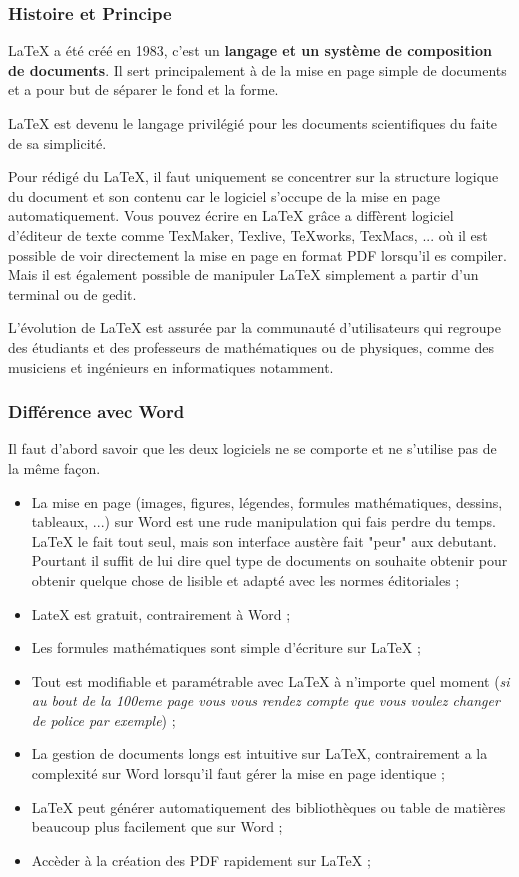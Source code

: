 \subsubsection{Histoire et Principe}

LaTeX a été créé en 1983, c'est un \textbf{langage et un système de composition de documents}.
Il sert principalement à de la mise en page simple de documents et a pour but de séparer le fond et la forme. 

LaTeX est devenu le langage privilégié pour les documents scientifiques du faite de sa simplicité. 

Pour rédigé du LaTeX, il faut uniquement se concentrer sur la structure logique du document et son contenu car le logiciel s'occupe de la mise en page automatiquement. 
Vous pouvez écrire en LaTeX grâce a diffèrent logiciel d’éditeur de texte comme TexMaker, Texlive, TeXworks, TexMacs, ... où il est possible de voir directement la mise en page en format PDF lorsqu'il es compiler.
Mais il est également possible de manipuler LaTeX simplement a partir d'un terminal ou de gedit.

L'évolution de LaTeX est assurée par la communauté d'utilisateurs qui regroupe des étudiants et des professeurs de mathématiques ou de physiques, comme des musiciens et ingénieurs en informatiques notamment.


\subsubsection{Différence avec Word}

Il faut d'abord savoir que les deux logiciels ne se comporte et ne s'utilise pas de la même façon. 

\begin{itemize}
\item La mise en page (images, figures, légendes, formules mathématiques, dessins, tableaux, ...) sur Word est une rude manipulation qui fais perdre du temps. LaTeX le fait tout seul, mais son interface austère fait "peur" aux debutant. Pourtant il suffit de lui dire quel type de documents on souhaite obtenir pour obtenir quelque chose de lisible et adapté avec les normes éditoriales ;
\item LateX est gratuit, contrairement à Word ;
\item Les formules mathématiques sont simple d'écriture sur LaTeX ;
\item Tout est modifiable et paramétrable avec LaTeX à n'importe quel moment (\textit{si au bout de la 100eme page vous vous rendez compte que vous voulez changer de police par exemple}) ;
\item La gestion de documents longs est intuitive sur LaTeX, contrairement a la complexité sur Word lorsqu'il faut gérer la mise en page identique ;
\item LaTeX peut générer automatiquement des bibliothèques ou table de matières beaucoup plus facilement que sur Word ;
\item Accèder à la création des PDF rapidement sur LaTeX ;
\end{itemize}


